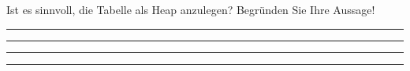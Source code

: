 \item Ist es sinnvoll, die Tabelle  als Heap anzulegen?
Begründen Sie Ihre Aussage!

  \rule{0.94\textwidth}{0.5pt}

  \rule{0.94\textwidth}{0.5pt}

  \rule{0.94\textwidth}{0.5pt}

  \rule{0.94\textwidth}{0.5pt}


